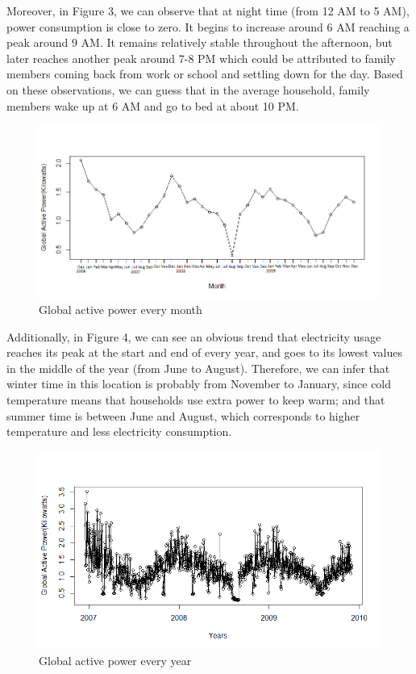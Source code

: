 \documentclass[letterpaper, 11pt]{article}%
\begin{document}
Moreover, in Figure 3, we can observe that at night time (from 12 AM to 5 AM), power consumption is close to zero. It begins to increase around 6 AM reaching a peak around 9 AM. It remains relatively stable throughout the afternoon, but later reaches another peak around 7-8 PM which could be attributed to family members coming back from work or school and settling down for the day. Based on these observations, we can guess that in the average household, family members wake up at 6 AM and go to bed at about 10 PM.
\begin{figure}[H]
  \centering
  \includegraphics[scale=0.4]{fig3}
  \caption{Global active power every month}
\end{figure}
Additionally, in Figure 4, we can see an obvious trend that electricity usage reaches its peak at the start and end of every year, and goes to its lowest values in the middle of the year (from June to August). Therefore, we can infer that winter time in this location is probably from November to January, since cold temperature means that households use extra power to keep warm; and that summer time is between June and August, which corresponds to higher temperature and less electricity consumption.
\begin{figure}[H]
  \centering
  \includegraphics[scale=0.4]{fig4}
  \caption{Global active power every year}
\end{figure}
\end{document}
